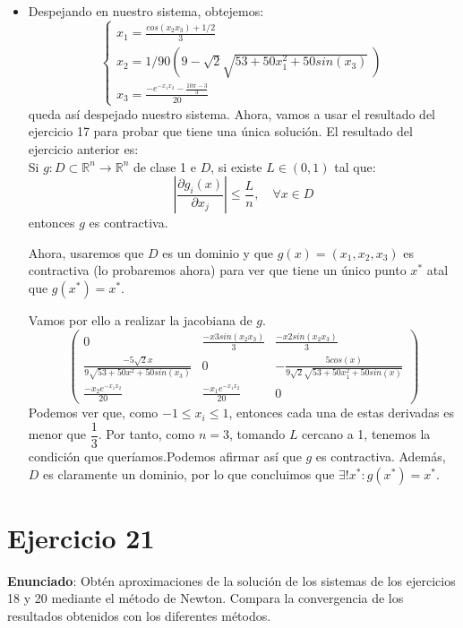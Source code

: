 \documentclass[11pt]{article}
\begin{document}
\begin{itemize}
	\item Despejando en nuestro sistema, obtejemos:
	\[
	\begin{cases}
	x_1 = \frac{cos(x_2x_3) + 1/2}{3}\\
 x_2 = 1/90 (9 - \sqrt2 \sqrt{53 + 50 x_1^2 + 50 sin(x_3)}\ )\\
  x_3 = \frac{-e^{-x_1x_2}- \frac{10\pi-3}{3}}{20}
\end{cases}
	\]
	queda así despejado nuestro sistema.
	Ahora, vamos a usar el resultado del ejercicio 17 para probar que tiene una única solución.
	El resultado del ejercicio anterior es:\\
	Si $g:D\subset \mathbb R^n \to \mathbb R^n$ de clase 1 e $D$, si existe $L \in (0,1)$ tal que:
	\[
	|\dfrac{\partial g_i(x)}{\partial x_j}| \leq \dfrac{L}{n}, \quad \forall x \in D
	\]
	entonces $g$ es contractiva.
	
	Ahora, usaremos que $D$ es un dominio y que $g(x) = (x_1,x_2,x_3)$ es contractiva (lo probaremos ahora) para ver que tiene un único punto $x^*$ atal que $g(x^*) = x^*$.
	
	Vamos por ello a realizar la jacobiana de $g$.
\[	\begin{pmatrix}
    0 & \frac{-x3 sin(x_2x_3)}{3} & \frac{-x2 sin(x_2x_3)}{3}\\
    
  \frac{-5 \sqrt2 x}{9 \sqrt{53 + 50 x^2 + 50 sin(x_3)}}& 0 &  -\frac{5 cos(x)}{9 \sqrt2 \sqrt{53 + 50 x_1^2 + 50 sin(x)}} \\
    
    \frac{-x_2e^{-x_1x_2}}{20} & 
    \frac{-x_1e^{-x_1x_2}}{20} & 0
  \end{pmatrix}
 \]
 Podemos ver que, como $-1 \leq x_i \leq 1$, entonces cada una de estas derivadas es menor que $\dfrac{1}{3}$. Por tanto, como $n=3$, tomando $L$ cercano a 1, tenemos la condición que queríamos.Podemos afirmar así que $g$ es contractiva. Además, $D$ es claramente un dominio, por lo que concluimos que $\exists ! x^* : g(x^*) = x^*$.
\end{itemize}

\section{Ejercicio 21}
\textbf{Enunciado}: Obtén aproximaciones de la solución de los sistemas de los ejercicios 18 y 20 mediante el método de Newton. Compara la convergencia de los resultados obtenidos con los diferentes métodos.
\end{document}

